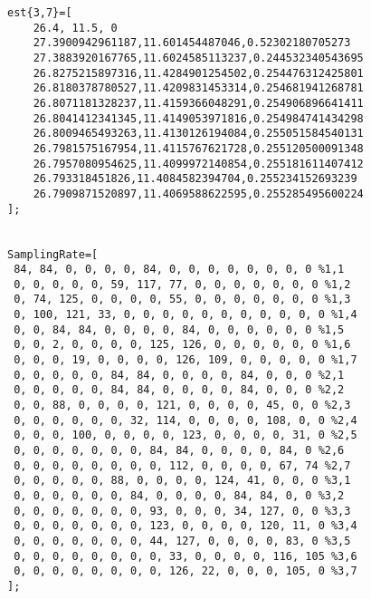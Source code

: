 \begin{verbatim}
est{3,7}=[
    26.4, 11.5, 0
    27.3900942961187,11.601454487046,0.52302180705273
    27.3883920167765,11.6024585113237,0.244532340543695
    26.8275215897316,11.4284901254502,0.254476312425801
    26.8180378780527,11.4209831453314,0.254681941268781
    26.8071181328237,11.4159366048291,0.254906896641411
    26.8041412341345,11.4149053971816,0.254984741434298
    26.8009465493263,11.4130126194084,0.255051584540131
    26.7981575167954,11.4115767621728,0.255120500091348
    26.7957080954625,11.4099972140854,0.255181611407412
    26.793318451826,11.4084582394704,0.255234152693239
    26.7909871520897,11.4069588622595,0.255285495600224
];


SamplingRate=[
 84, 84, 0, 0, 0, 0, 84, 0, 0, 0, 0, 0, 0, 0, 0 %1,1
 0, 0, 0, 0, 0, 59, 117, 77, 0, 0, 0, 0, 0, 0, 0 %1,2
 0, 74, 125, 0, 0, 0, 0, 55, 0, 0, 0, 0, 0, 0, 0 %1,3
 0, 100, 121, 33, 0, 0, 0, 0, 0, 0, 0, 0, 0, 0, 0 %1,4
 0, 0, 84, 84, 0, 0, 0, 0, 84, 0, 0, 0, 0, 0, 0 %1,5
 0, 0, 2, 0, 0, 0, 0, 125, 126, 0, 0, 0, 0, 0, 0 %1,6
 0, 0, 0, 19, 0, 0, 0, 0, 126, 109, 0, 0, 0, 0, 0 %1,7
 0, 0, 0, 0, 0, 84, 84, 0, 0, 0, 0, 84, 0, 0, 0 %2,1
 0, 0, 0, 0, 0, 84, 84, 0, 0, 0, 0, 84, 0, 0, 0 %2,2
 0, 0, 88, 0, 0, 0, 0, 121, 0, 0, 0, 0, 45, 0, 0 %2,3
 0, 0, 0, 0, 0, 0, 32, 114, 0, 0, 0, 0, 108, 0, 0 %2,4
 0, 0, 0, 100, 0, 0, 0, 0, 123, 0, 0, 0, 0, 31, 0 %2,5
 0, 0, 0, 0, 0, 0, 0, 84, 84, 0, 0, 0, 0, 84, 0 %2,6
 0, 0, 0, 0, 0, 0, 0, 0, 112, 0, 0, 0, 0, 67, 74 %2,7
 0, 0, 0, 0, 0, 88, 0, 0, 0, 0, 124, 41, 0, 0, 0 %3,1
 0, 0, 0, 0, 0, 0, 84, 0, 0, 0, 0, 84, 84, 0, 0 %3,2
 0, 0, 0, 0, 0, 0, 0, 93, 0, 0, 0, 34, 127, 0, 0 %3,3
 0, 0, 0, 0, 0, 0, 0, 123, 0, 0, 0, 0, 120, 11, 0 %3,4
 0, 0, 0, 0, 0, 0, 0, 44, 127, 0, 0, 0, 0, 83, 0 %3,5
 0, 0, 0, 0, 0, 0, 0, 0, 33, 0, 0, 0, 0, 116, 105 %3,6
 0, 0, 0, 0, 0, 0, 0, 0, 126, 22, 0, 0, 0, 105, 0 %3,7
];


\end{verbatim}
